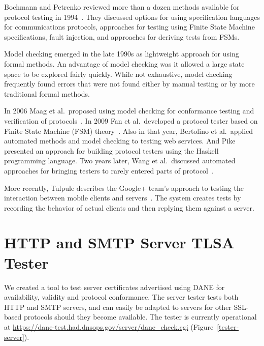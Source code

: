 \documentclass[preprint,3p,11pt]{elsarticle}
\begin{document}
Bochmann and Petrenko reviewed more than a dozen methods available for protocol testing
in 1994~\cite{Bochmann:1994:PTR:186258.187153}. They discussed options
for using specification languages for communications protocols,
approaches for testing using Finite State Machine specifications,
fault injection, and approaches for deriving tests from FSMs.

Model checking emerged in the late 1990s as lightweight approach for
using formal methods. An advantage of model checking was it allowed a
large state space to be explored fairly quickly. While not exhaustive,
model checking frequently found errors that were not found either by
manual testing or by more traditional formal methods.

In 2006 Maag et al.\ proposed using model checking for conformance testing and
verification of protocols~\cite{Maag:2006:TMA:1163653.1163663}. In 2009 Fan et al.\ developed a protocol tester based on Finite State Machine
(FSM) theory~\cite{Fan:2009:PPT:1582379.1582477}. Also in that year,
Bertolino et al.\ applied automated methods and model checking to
testing web services\cite{Bertolino:2009:ASB:1595696.1595719}. And Pike presented an approach for building protocol testers using the
Haskell programming language\cite{Pike:2009:RYO:1596638.1596646}. Two
years later, Wang et al.\ discussed automated approaches for bringing testers to rarely
entered parts of protocol~\cite{Wang:2011:ADP:2069131.2069166}.

More recently, Tulpule describes the Google+ team's approach to testing the
interaction between mobile clients and
servers~\cite{Tulpule:2013:STC:2542128.2542134}. The system creates
tests by recording the behavior of actual clients and then replying them
against a server. 

\section{HTTP and SMTP Server TLSA Tester}
We created a tool to test server certificates advertised using DANE
for availability, validity and protocol conformance. The server tester
tests both HTTP and SMTP servers, and can easily be adapted to servers
for other SSL-based protocols should they become available. The tester
is currently operational at
\url{https://dane-test.had.dnsops.gov/server/dane_check.cgi} (Figure~\ref{tester-server}).

\end{document}
